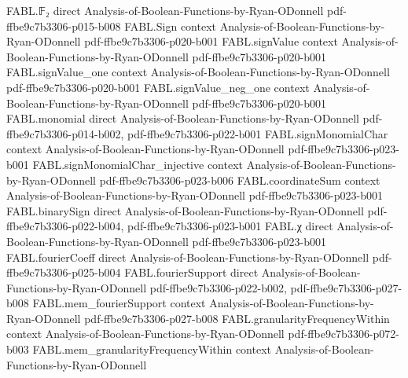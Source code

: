 \begin{theorem}
\label{FABL.BooleanCircuit.toExactlyThreeCNF_size_le}
\leanok
{}
\proofstep
  {FABL.𝔽₂}
  {direct}
  {Analysis-of-Boolean-Functions-by-Ryan-ODonnell}
  {pdf-ffbe9c7b3306-p015-b008}
\proofstep
  {FABL.Sign}
  {context}
  {Analysis-of-Boolean-Functions-by-Ryan-ODonnell}
  {pdf-ffbe9c7b3306-p020-b001}
\proofstep
  {FABL.signValue}
  {context}
  {Analysis-of-Boolean-Functions-by-Ryan-ODonnell}
  {pdf-ffbe9c7b3306-p020-b001}
\proofstep
  {FABL.signValue_one}
  {context}
  {Analysis-of-Boolean-Functions-by-Ryan-ODonnell}
  {pdf-ffbe9c7b3306-p020-b001}
\proofstep
  {FABL.signValue_neg_one}
  {context}
  {Analysis-of-Boolean-Functions-by-Ryan-ODonnell}
  {pdf-ffbe9c7b3306-p020-b001}
\proofstep
  {FABL.monomial}
  {direct}
  {Analysis-of-Boolean-Functions-by-Ryan-ODonnell}
  {pdf-ffbe9c7b3306-p014-b002,
    pdf-ffbe9c7b3306-p022-b001}
\proofstep
  {FABL.signMonomialChar}
  {context}
  {Analysis-of-Boolean-Functions-by-Ryan-ODonnell}
  {pdf-ffbe9c7b3306-p023-b001}
\proofstep
  {FABL.signMonomialChar_injective}
  {context}
  {Analysis-of-Boolean-Functions-by-Ryan-ODonnell}
  {pdf-ffbe9c7b3306-p023-b006}
\proofstep
  {FABL.coordinateSum}
  {context}
  {Analysis-of-Boolean-Functions-by-Ryan-ODonnell}
  {pdf-ffbe9c7b3306-p023-b001}
\proofstep
  {FABL.binarySign}
  {direct}
  {Analysis-of-Boolean-Functions-by-Ryan-ODonnell}
  {pdf-ffbe9c7b3306-p022-b004,
    pdf-ffbe9c7b3306-p023-b001}
\proofstep
  {FABL.χ}
  {direct}
  {Analysis-of-Boolean-Functions-by-Ryan-ODonnell}
  {pdf-ffbe9c7b3306-p023-b001}
\proofstep
  {FABL.fourierCoeff}
  {direct}
  {Analysis-of-Boolean-Functions-by-Ryan-ODonnell}
  {pdf-ffbe9c7b3306-p025-b004}
\proofstep
  {FABL.fourierSupport}
  {direct}
  {Analysis-of-Boolean-Functions-by-Ryan-ODonnell}
  {pdf-ffbe9c7b3306-p022-b002,
    pdf-ffbe9c7b3306-p027-b008}
\proofstep
  {FABL.mem_fourierSupport}
  {context}
  {Analysis-of-Boolean-Functions-by-Ryan-ODonnell}
  {pdf-ffbe9c7b3306-p027-b008}
\proofstep
  {FABL.granularityFrequencyWithin}
  {context}
  {Analysis-of-Boolean-Functions-by-Ryan-ODonnell}
  {pdf-ffbe9c7b3306-p072-b003}
\proofstep
  {FABL.mem_granularityFrequencyWithin}
  {context}
  {Analysis-of-Boolean-Functions-by-Ryan-ODonnell}

\end{theorem}

